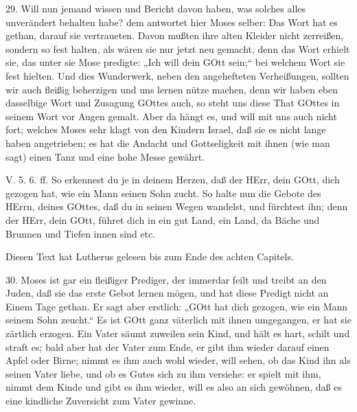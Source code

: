 29. Will nun jemand wissen und Bericht davon haben, was solches alles unverändert behalten habe? dem antwortet hier Moses selber: Das Wort hat es gethan, darauf sie vertraueten. Davon mußten ihre alten Kleider nicht zerreißen, sondern so fest halten, als wären sie nur jetzt neu gemacht, denn das Wort erhielt sie, das unter sie Mose predigte: „Ich will dein GOtt sein;“ bei welchem Wort sie fest hielten. Und dies Wunderwerk, neben den angehefteten Verheißungen, sollten wir auch fleißig beherzigen und uns lernen nütze machen, denn wir haben eben dasselbige Wort und Zusagung GOttes auch, so steht uns diese That GOttes in seinem Wort vor Augen gemalt. Aber da hängt es, und will mit uns auch nicht fort; welches Moses sehr klagt von den Kindern Israel, daß sie es nicht lange haben angetrieben; es hat die Andacht und Gottseligkeit mit ihnen (wie man sagt) einen Tanz und eine hohe Messe gewährt.

\begin{schriftzitat}
V. 5. 6. ff. So erkennest du je in deinem Herzen, daß der HErr, dein GOtt, dich gezogen hat, wie ein Mann seinen Sohn zucht. So halte nun die Gebote des HErrn, deines GOttes, daß du in seinen Wegen wandelst, und fürchtest ihn; denn der HErr, dein GOtt, führet dich in ein gut Land, ein Land, da Bäche und Brunnen und Tiefen innen sind etc.
\end{schriftzitat}

Diesen Text hat Lutherus gelesen bis zum Ende des achten Capitels.

30. Moses ist gar ein fleißiger Prediger, der immerdar feilt und treibt an den Juden, daß sie das erste Gebot lernen mögen, und hat diese Predigt nicht an Einem Tage gethan. Er sagt aber erstlich: „GOtt hat dich gezogen, wie ein Mann seinem Sohn zeucht.“ Es ist GOtt ganz väterlich mit ihnen umgegangen, er hat sie zärtlich erzogen. Ein Vater säumt zuweilen sein Kind, und hält es hart, schilt und straft es; bald aber hat der Vater zum Ende, er gibt ihm wieder darauf einen Apfel oder Birne; nimmt es ihm auch wohl wieder, will sehen, ob das Kind ihn als seinen Vater liebe, und ob es Gutes sich zu ihm versiehe: er spielt mit ihm, nimmt dem Kinde und gibt es ihm wieder, will es also an sich gewöhnen, daß es eine kindliche Zuversicht zum Vater gewinne.

